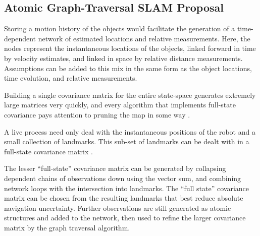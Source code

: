 \documentclass{article}
\begin{document}
  \pagebreak


\renewcommand{\refname}{References}


%


\begin{appendices}
%    


  \section{Atomic Graph-Traversal SLAM Proposal} \label{sec:SLAMproposal}
    
    Storing a motion history of the objects would facilitate the generation of a time-dependent network of estimated locations and relative measurements.
    Here, the nodes represent the instantaneous locations of the objects, linked forward in time by velocity estimates, and linked in space by relative distance measurements.  Assumptions can be added to this mix in the same form as the object locations, time evolution, and relative measurements.

    Building a single covariance matrix for the entire state-space generates extremely large matrices very quickly, and every algorithm that implements full-state covariance pays attention to pruning the map in some way\cite{monoslam} \cite{airshipSLAM}.
    
    A live process need only deal with the instantaneous positions of the robot and a small collection of landmarks. This sub-set of landmarks can be dealt with in a full-state covariance matrix \cite{monoslam}.  
    
    The lesser ``full-state'' covariance matrix can be generated by collapsing dependent chains of observations down using the vector sum, and combining network loops with the intersection into landmarks.  The ``full state'' covariance matrix can be chosen from the resulting landmarks that best reduce absolute navigation uncertainty.  Further observations are still generated as atomic structures and added to the network, then used to refine the larger covariance matrix by the graph traversal algorithm.  


\end{appendices}
\end{document}
